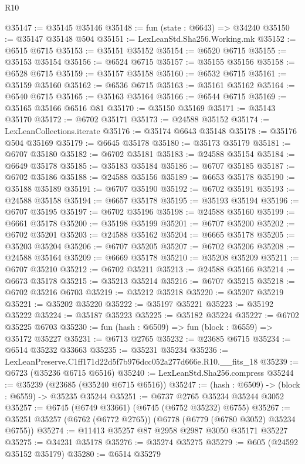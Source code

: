 \begin{lexlean}{R10}
\begin{coremodule}
@35147 := @35145 @35146
@35148 := fun (state : @6643) => @34240
@35150 := @35147 @35148 @504
@35151 := LexLeanStd.Sha256.Working.mk
@35152 := @6515 @6715
@35153 := @35151 @35152
@35154 := @6520 @6715
@35155 := @35153 @35154
@35156 := @6524 @6715
@35157 := @35155 @35156
@35158 := @6528 @6715
@35159 := @35157 @35158
@35160 := @6532 @6715
@35161 := @35159 @35160
@35162 := @6536 @6715
@35163 := @35161 @35162
@35164 := @6540 @6715
@35165 := @35163 @35164
@35166 := @6544 @6715
@35169 := @35165 @35166 @6516 @81
@35170 := @35150 @35169
@35171 := @35143 @35170
@35172 := @6702 @35171
@35173 := @24588 @35152
@35174 := LexLeanCollections.iterate
@35176 := @35174 @6643 @35148
@35178 := @35176 @504 @35169
@35179 := @6645 @35178
@35180 := @35173 @35179
@35181 := @6707 @35180
@35182 := @6702 @35181
@35183 := @24588 @35154
@35184 := @6649 @35178
@35185 := @35183 @35184
@35186 := @6707 @35185
@35187 := @6702 @35186
@35188 := @24588 @35156
@35189 := @6653 @35178
@35190 := @35188 @35189
@35191 := @6707 @35190
@35192 := @6702 @35191
@35193 := @24588 @35158
@35194 := @6657 @35178
@35195 := @35193 @35194
@35196 := @6707 @35195
@35197 := @6702 @35196
@35198 := @24588 @35160
@35199 := @6661 @35178
@35200 := @35198 @35199
@35201 := @6707 @35200
@35202 := @6702 @35201
@35203 := @24588 @35162
@35204 := @6665 @35178
@35205 := @35203 @35204
@35206 := @6707 @35205
@35207 := @6702 @35206
@35208 := @24588 @35164
@35209 := @6669 @35178
@35210 := @35208 @35209
@35211 := @6707 @35210
@35212 := @6702 @35211
@35213 := @24588 @35166
@35214 := @6673 @35178
@35215 := @35213 @35214
@35216 := @6707 @35215
@35218 := @6702 @35216 @6703
@35219 := @35212 @35218
@35220 := @35207 @35219
@35221 := @35202 @35220
@35222 := @35197 @35221
@35223 := @35192 @35222
@35224 := @35187 @35223
@35225 := @35182 @35224
@35227 := @6702 @35225 @6703
@35230 := fun (hash : @6509) => fun (block : @6559) => @35172 @35227
@35231 := @6713 @2765
@35232 := @23685 @6715
@35234 := @6514 @35232 @33663
@35235 := @35231 @35234
@35236 := LexLeanPreserve.C1ff171d22d5f7b976dcc052a277d666e.R10.__fits_18
@35239 := @6723 (@35236 @6715 @6516)
@35240 := LexLeanStd.Sha256.compress
@35244 := @35239 (@23685 (@35240 @6715 @6516))
@35247 := (hash : @6509) -> (block : @6559) -> @35235 @35244
@35251 := @6737 @2765 @35234 @35244 @3052
@35257 := @6745 (@6749 @33661) (@6745 (@6752 @35232) @6755)
@35267 := @35251 @35257 (@6762 (@6772 @2765)) (@6778 (@6779 (@6780 @3052) @35234 @6755))
@35274 := @11413 @35257 @87 @2958 @2987 @3050 @35171 @35227
@35275 := @34231 @35178
@35276 := @35274 @35275
@35279 := @605 (@24592 @35152 @35179)
@35280 := @6514 @35279

\end{coremodule}
\end{lexlean}
